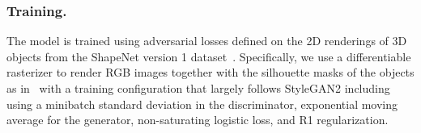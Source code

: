 \subsubsection{Training.} The model is trained using adversarial losses defined on the 2D renderings of 3D objects from the ShapeNet version 1 dataset~\cite{shapenet2015}. Specifically, we use a differentiable rasterizer to render RGB images together with the silhouette masks of the objects as in~\cite{gao2022get3d}  with a training configuration that largely follows StyleGAN2 \cite{karras2020styleGAN2} including using a minibatch standard deviation in the discriminator, exponential moving average for the generator, non-saturating logistic loss, and R1 regularization. %